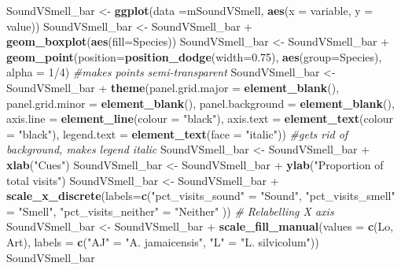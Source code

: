 \documentclass[]{article}
\newenvironment{Shaded}{\begin{snugshade}}{\end{snugshade}}
\newcommand{\KeywordTok}[1]{\textcolor[rgb]{0.13,0.29,0.53}{\textbf{{#1}}}}
\newcommand{\DataTypeTok}[1]{\textcolor[rgb]{0.13,0.29,0.53}{{#1}}}
\newcommand{\DecValTok}[1]{\textcolor[rgb]{0.00,0.00,0.81}{{#1}}}
\newcommand{\FloatTok}[1]{\textcolor[rgb]{0.00,0.00,0.81}{{#1}}}
\newcommand{\StringTok}[1]{\textcolor[rgb]{0.31,0.60,0.02}{{#1}}}
\newcommand{\CommentTok}[1]{\textcolor[rgb]{0.56,0.35,0.01}{\textit{{#1}}}}
\newcommand{\NormalTok}[1]{{#1}}
\begin{document}
\begin{Shaded}
\begin{Highlighting}[]
\NormalTok{SoundVSmell_bar <-}\StringTok{ }\KeywordTok{ggplot}\NormalTok{(}\DataTypeTok{data =}\NormalTok{mSoundVSmell, }\KeywordTok{aes}\NormalTok{(}\DataTypeTok{x =} \NormalTok{variable, }\DataTypeTok{y =} \NormalTok{value))}
\NormalTok{SoundVSmell_bar <-}\StringTok{ }\NormalTok{SoundVSmell_bar +}\StringTok{ }\KeywordTok{geom_boxplot}\NormalTok{(}\KeywordTok{aes}\NormalTok{(}\DataTypeTok{fill=}\NormalTok{Species))}
\NormalTok{SoundVSmell_bar <-}\StringTok{ }\NormalTok{SoundVSmell_bar +}\StringTok{ }\KeywordTok{geom_point}\NormalTok{(}\DataTypeTok{position=}\KeywordTok{position_dodge}\NormalTok{(}\DataTypeTok{width=}\FloatTok{0.75}\NormalTok{), }\KeywordTok{aes}\NormalTok{(}\DataTypeTok{group=}\NormalTok{Species), }\DataTypeTok{alpha =} \DecValTok{1}\NormalTok{/}\DecValTok{4}\NormalTok{) }\CommentTok{#makes points semi-transparent}
\NormalTok{SoundVSmell_bar <-}\StringTok{ }\NormalTok{SoundVSmell_bar +}\StringTok{ }\KeywordTok{theme}\NormalTok{(}\DataTypeTok{panel.grid.major =} \KeywordTok{element_blank}\NormalTok{(), }\DataTypeTok{panel.grid.minor =} \KeywordTok{element_blank}\NormalTok{(),}
\DataTypeTok{panel.background =} \KeywordTok{element_blank}\NormalTok{(), }\DataTypeTok{axis.line =} \KeywordTok{element_line}\NormalTok{(}\DataTypeTok{colour =} \StringTok{"black"}\NormalTok{), }\DataTypeTok{axis.text =} \KeywordTok{element_text}\NormalTok{(}\DataTypeTok{colour =} \StringTok{"black"}\NormalTok{), }\DataTypeTok{legend.text =} \KeywordTok{element_text}\NormalTok{(}\DataTypeTok{face =} \StringTok{"italic"}\NormalTok{))  }\CommentTok{#gets rid of background, makes legend italic}
\NormalTok{SoundVSmell_bar <-}\StringTok{ }\NormalTok{SoundVSmell_bar +}\StringTok{ }\KeywordTok{xlab}\NormalTok{(}\StringTok{"Cues"}\NormalTok{)}
\NormalTok{SoundVSmell_bar <-}\StringTok{ }\NormalTok{SoundVSmell_bar +}\StringTok{ }\KeywordTok{ylab}\NormalTok{(}\StringTok{"Proportion of total visits"}\NormalTok{)}
\NormalTok{SoundVSmell_bar <-}\StringTok{ }\NormalTok{SoundVSmell_bar +}\StringTok{ }\KeywordTok{scale_x_discrete}\NormalTok{(}\DataTypeTok{labels=}\KeywordTok{c}\NormalTok{(}\StringTok{"pct_visits_sound"} \NormalTok{=}\StringTok{ "Sound"}\NormalTok{, }\StringTok{"pct_visits_smell"} \NormalTok{=}\StringTok{ "Smell"}\NormalTok{,}
                              \StringTok{"pct_visits_neither"} \NormalTok{=}\StringTok{ "Neither"} \NormalTok{))  }\CommentTok{# Relabelling X axis}
\NormalTok{SoundVSmell_bar <-}\StringTok{ }\NormalTok{SoundVSmell_bar +}\StringTok{ }\KeywordTok{scale_fill_manual}\NormalTok{(}\DataTypeTok{values =} \KeywordTok{c}\NormalTok{(Lo, Art), }\DataTypeTok{labels =} \KeywordTok{c}\NormalTok{(}\StringTok{"AJ"} \NormalTok{=}\StringTok{ "A. jamaicensis"}\NormalTok{, }\StringTok{"L"} \NormalTok{=}\StringTok{ "L. silvicolum"}\NormalTok{))}
\NormalTok{SoundVSmell_bar}
\end{Highlighting}
\end{Shaded}
\end{document}

